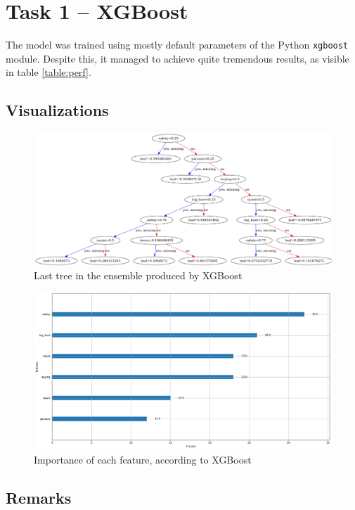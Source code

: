 \documentclass[../main.tex]{subfiles}
\begin{document}
\section{Task 1 -- XGBoost}
The model was trained using mostly default parameters of the Python
\verb`xgboost` module. Despite this, it managed to achieve quite tremendous
results, as visible in table \ref{table:perf}.

\subsection{Visualizations}
\begin{figure}[H]
	\centering
	\includegraphics[width=\linewidth]{../img/xgb-tree.png}
	\caption{Last tree in the ensemble produced by XGBoost}
	\label{fig:xgb-tree}
\end{figure}
\begin{figure}[H]
	\centering
	\includegraphics[width=\linewidth]{../img/xgb-feature-importance.png}
	\caption{Importance of each feature, according to XGBoost}
	\label{fig:xgb-feats-native}
\end{figure}

\subsection{Remarks}
\end{document}
